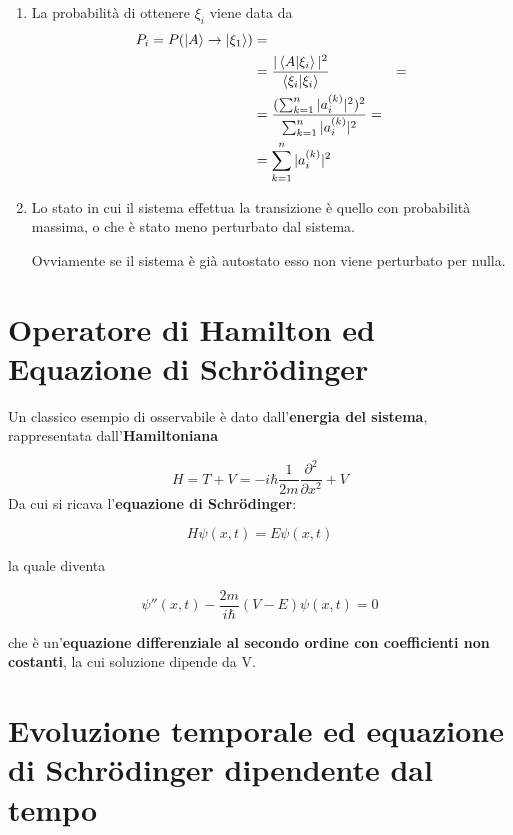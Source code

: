 \begin{enumerate}
	\item La probabilità di ottenere $\xi_i$ viene data da
	\begin{align}
	P_i=P(\ket{A} \rightarrow \ket{\xi_1}){}&= \nonumber \\ &=\frac{|\braket{A|\xi_i}|^2}{\braket{\xi_i|\xi_i}} &= \nonumber \\
	&=\frac{(\sum_{k=1}^n |a_i^{(k)}|^2)^2}{\sum_{k=1}^n |a_i^{(k)}|^2}= \nonumber \\ &=\sum_{k=1}^n |a_i^{(k)}|^2
	\end{align}
	\item Lo stato in cui il sistema effettua la transizione è quello con probabilità massima, o che è stato meno perturbato dal sistema.
	
	Ovviamente se il sistema è già autostato esso non viene perturbato per nulla.
\end{enumerate}

\newpage
 
 
\section{Operatore di Hamilton ed Equazione di Schrödinger}
 
Un classico esempio di osservabile è dato dall'\textbf{energia del sistema}, rappresentata dall'\textbf{Hamiltoniana}

\begin{equation}
H= T + V = -i\hbar \frac{1}{2m} \frac{\partial^2}{\partial x^2} + V
\end{equation}
\newline
Da cui si ricava l'\textbf{equazione di Schrödinger}:

\begin{equation}
H\psi(x,t) = E\psi(x,t) 
\end{equation}

la quale diventa

\begin{equation}
\psi''(x,t) -\frac{2m}{i\hbar} (V-E)\psi(x,t)=0
\end{equation}

che è un'\textbf{equazione differenziale al secondo ordine con coefficienti non costanti}, la cui soluzione dipende da V. \newline


\section{Evoluzione temporale ed equazione di Schrödinger dipendente dal tempo}

